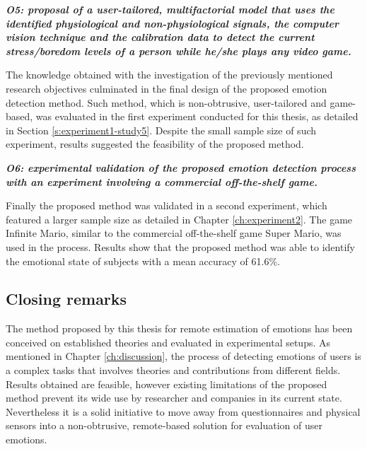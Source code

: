 \textit{\textbf{O5: proposal of a user-tailored, multifactorial model that uses the identified physiological and non-physiological signals, the computer vision technique and the calibration data to detect the current stress/boredom levels of a person while he/she plays any video game.}}

The knowledge obtained with the investigation of the previously mentioned research objectives culminated in the final design of the proposed emotion detection method. Such method, which is non-obtrusive, user-tailored and game-based, was evaluated in the first experiment conducted for this thesis, as detailed in Section \ref{s:experiment1-study5}. Despite the small sample size of such experiment, results suggested the feasibility of the proposed method.

\textit{\textbf{O6: experimental validation of the proposed emotion detection process with an experiment involving a commercial off-the-shelf game.}}

Finally the proposed method was validated in a second experiment, which featured a larger sample size as detailed in Chapter \ref{ch:experiment2}. The game Infinite Mario, similar to the commercial off-the-shelf game Super Mario, was used in the process. Results show that the proposed method was able to identify the emotional state of subjects with a mean accuracy of 61.6\%.

\subsection{Closing remarks}

The method proposed by this thesis for remote estimation of emotions has been conceived on established theories and evaluated in experimental setups. As mentioned in Chapter \ref{ch:discussion}, the process of detecting emotions of users is a complex tasks that involves theories and contributions from different fields. Results obtained are feasible, however existing limitations of the proposed method prevent its wide use by researcher and companies in its current state. Nevertheless it is a solid initiative to move away from questionnaires and physical sensors into a non-obtrusive, remote-based solution for evaluation of user emotions.


